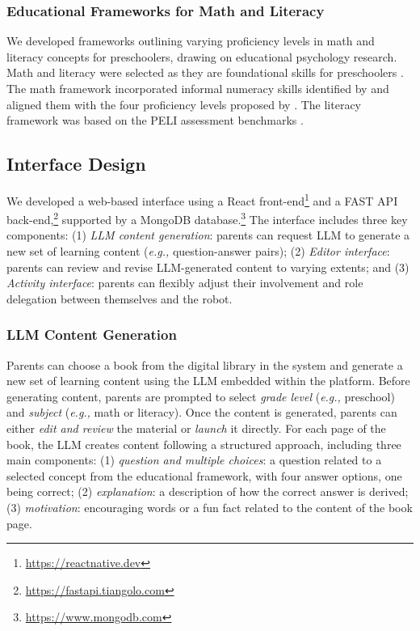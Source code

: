 \subsubsection{Educational Frameworks for Math and Literacy} 
We developed frameworks outlining varying proficiency levels in math \cite{purpura2013informal, engel2013teaching} and literacy \cite{kaminski2014preschool} concepts for preschoolers, drawing on educational psychology research. Math and literacy were selected as they are foundational skills for preschoolers \cite{weiland2013impacts}. The math framework incorporated informal numeracy skills identified by \citet{purpura2013informal} and aligned them with the four proficiency levels proposed by \citet{engel2013teaching}. The literacy framework was based on the PELI assessment benchmarks \cite{kaminski2014preschool}.

\subsection{Interface Design}
We developed a web-based interface using a React front-end\footnote{\url{https://reactnative.dev}} and a FAST API back-end,\footnote{\url{https://fastapi.tiangolo.com}} supported by a MongoDB database.\footnote{\url{https://www.mongodb.com}} The interface includes three key components: (1) \textit{LLM content generation}: parents can request LLM to generate a new set of learning content (\textit{e.g.,} question-answer pairs); (2) \textit{Editor interface}: parents can review and revise LLM-generated content to varying extents; and (3) \textit{Activity interface}: parents can flexibly adjust their involvement and role delegation between themselves and the robot. 

\subsubsection{LLM Content Generation}
Parents can choose a book from the digital library in the system and generate a new set of learning content using the LLM embedded within the platform. Before generating content, parents are prompted to select \textit{grade level} (\textit{e.g.,} preschool) and \textit{subject} (\textit{e.g.,} math or literacy). Once the content is generated, parents can either \textit{edit and review} the material or \textit{launch} it directly. For each page of the book, the LLM creates content following a structured approach, including three main components: (1) \textit{question and multiple choices}: a question related to a selected concept from the educational framework, with four answer options, one being correct; (2) \textit{explanation}: a description of how the correct answer is derived; (3) \textit{motivation}: encouraging words or a fun fact related to the content of the book page.


